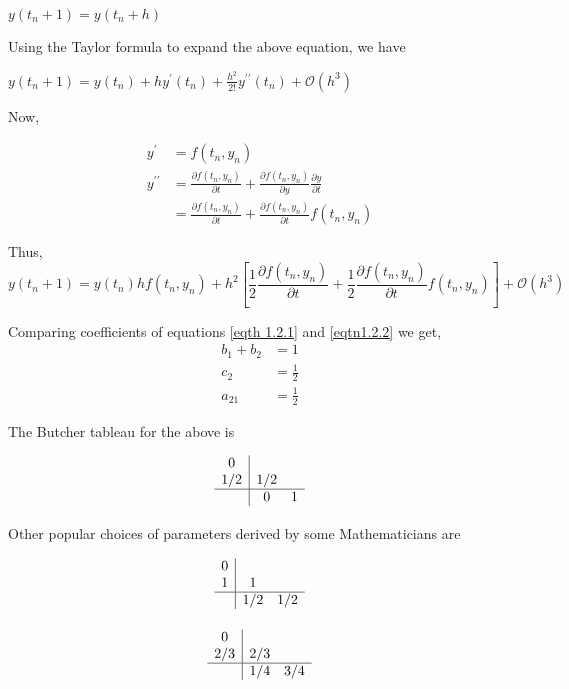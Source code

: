 \documentclass[12pt,a4paper]{article}
\begin{document}
$ y(t_n + 1) = y(t_n + h) $

Using the Taylor formula to expand the above equation, we have  

$ y(t_n + 1) = y(t_n)+ hy^\prime (t_n) + \frac{h^2}{2!}y^{\prime\prime} (t_n) + \mathcal{O}(h^3)  $

Now, 

\begin{align*}
y^\prime &= f(t_n, y_n) \\
y^{\prime\prime} &= \frac{\partial f(t_n, y_n)}{\partial t} + \frac{\partial f(t_n, y_n)}{\partial y}\frac{\partial y}{\partial t} \\
&= \frac{\partial f(t_n, y_n)}{\partial t} + \frac{\partial f(t_n, y_n)}{\partial t}f(t_n, y_n) 
\end{align*}

Thus, 
\begin{equation}\tag{1.2.2}\label{eqtn1.2.2}
y(t_n + 1) = y(t_n) hf(t_n, y_n) + h^2[\frac{1}{2} \frac{\partial f(t_n, y_n)}{\partial t} + \frac{1}{2} \frac{\partial f(t_n, y_n)}{\partial t}f(t_n, y_n)] + \mathcal{O}(h^3)
\end{equation}
  
Comparing coefficients of equations \ref{eqth 1.2.1} and \ref{eqtn1.2.2} we get,
\begin{align*}
b_1 + b_2 &= 1 \\ 
c_2 &= \frac{1}{2} \\
a_{21} &= \frac{1}{2} 
\end{align*}

The Butcher tableau for the above is

\begin{equation*}
  \begin{array}{c|cc}
    0     \\
    1/2     &1/2  \\
    \hline
    \vspace{2pt}
    \,  & 0  & 1
  \end{array}
\end{equation*}

Other popular choices of parameters derived by some Mathematicians are 

\begin{equation*}
  \begin{array}{c|cc}
    0     \\
    1     &1 \\
    \hline
    \vspace{2pt}
    \,  & 1/2  & 1/2
  \end{array}
\end{equation*}
$ \qquad $
\begin{equation*}
  \begin{array}{c|cc}
    0     \\
    2/3     &2/3  \\
    \hline
    \vspace{2pt}
    \,  & 1/4  & 3/4
  \end{array}
\end{equation*}
\end{document}
